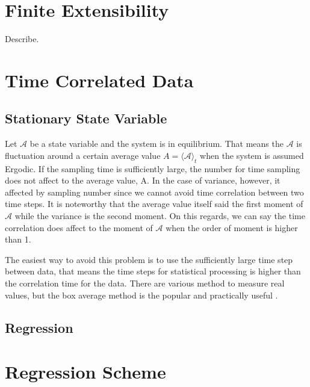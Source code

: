 \message{ !name(brief_Brownian_dynamics.tex)}\documentclass[10pt, a4paper]{report}
\begin{document}
\begin{appendices}

  \chapter{Finite Extensibility}
  Describe.

  \chapter{Time Correlated Data}
  \section{Stationary State Variable}
  Let $\mathscr{A}$ be a state variable and the system is in equilibrium. That means the $\mathscr{A}$ is fluctuation around a certain average value $A = \langle \mathscr{A}\rangle_t$ when the system is assumed Ergodic. If the sampling time is sufficiently large, the number for time sampling does not affect to the average value, A. In the case of variance, however, it affected by sampling number since we cannot avoid time correlation between two time steps. It is noteworthy that the average value itself said the first moment of $\mathscr{A}$ while the variance is the second moment. On this regards, we can say the time correlation does affect to the moment of $\mathscr{A}$ when the order of moment is higher than 1.

  The easiest way to avoid this problem is to use the sufficiently large time step between data, that means the time steps for statistical processing is higher than the correlation time for the data. There are various method to measure real values, but the box average method is the popular and practically useful \parencite{allen1989computer}.


  \section{Regression}

    
  \chapter{Regression Scheme}

\end{appendices}
\end{document}
